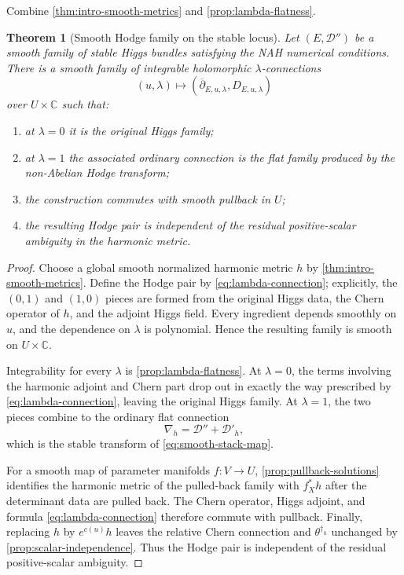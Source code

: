 \documentclass[11pt,reqno]{amsart}
\newtheorem{theorem}{Theorem}[section]
\theoremstyle{definition}
\theoremstyle{remark}
\newcommand{\C}{\mathbb C}
\newcommand{\cD}{\mathcal D}
\newcommand{\ddbar}{\overline\partial}
\begin{document}
Combine \cref{thm:intro-smooth-metrics} and \cref{prop:lambda-flatness}.

\begin{theorem}[Smooth Hodge family on the stable locus]\label{thm:stable-Hodge-family}
Let $(E,\cD'')$ be a smooth family of stable Higgs bundles satisfying the NAH numerical conditions.  There is a smooth family of integrable holomorphic $\lambda$-connections
\[
  (u,\lambda)\longmapsto
  (\ddbar_{E,u,\lambda},D_{E,u,\lambda})
\]
over $U\times\C$ such that:
\begin{enumerate}[label=(\roman*)]
\item at $\lambda=0$ it is the original Higgs family;
\item at $\lambda=1$ the associated ordinary connection is the flat family produced by the non-Abelian Hodge transform;
\item the construction commutes with smooth pullback in $U$;
\item the resulting Hodge pair is independent of the residual positive-scalar ambiguity in the harmonic metric.
\end{enumerate}
\end{theorem}

\begin{proof}
Choose a global smooth normalized harmonic metric $h$ by \cref{thm:intro-smooth-metrics}.  Define the Hodge pair by \eqref{eq:lambda-connection}; explicitly, the $(0,1)$ and $(1,0)$ pieces are formed from the original Higgs data, the Chern operator of $h$, and the adjoint Higgs field.  Every ingredient depends smoothly on $u$, and the dependence on $\lambda$ is polynomial.  Hence the resulting family is smooth on $U\times\C$.

Integrability for every $\lambda$ is \cref{prop:lambda-flatness}.  At $\lambda=0$, the terms involving the harmonic adjoint and Chern part drop out in exactly the way prescribed by \eqref{eq:lambda-connection}, leaving the original Higgs family.  At $\lambda=1$, the two pieces combine to the ordinary flat connection
\[
  \nabla_h=\cD''+\cD'_h,
\]
which is the stable transform of \eqref{eq:smooth-stack-map}.

For a smooth map of parameter manifolds $f:V\to U$, \cref{prop:pullback-solutions} identifies the harmonic metric of the pulled-back family with $f_X^*h$ after the determinant data are pulled back.  The Chern operator, Higgs adjoint, and formula \eqref{eq:lambda-connection} therefore commute with pullback.  Finally, replacing $h$ by $e^{c(u)}h$ leaves the relative Chern connection and $\theta^{\dagger_h}$ unchanged by \cref{prop:scalar-independence}.  Thus the Hodge pair is independent of the residual positive-scalar ambiguity.
\end{proof}
\end{document}
